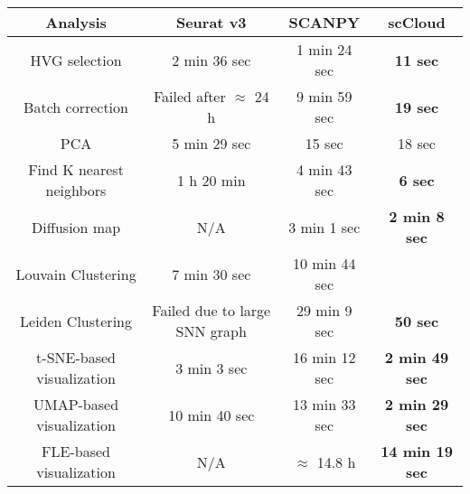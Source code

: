 \documentclass[10pt]{article}
\begin{document}
\begin{table}[H]
	\centering
	\begin{tabular}{|c|c|c|c|}
		\hline
		Analysis & Seurat v3 & SCANPY & scCloud\\
		\hline \hline
		HVG selection & 2 min 36 sec & 1 min 24 sec & \textbf{11 sec} \\
		\hline
		Batch correction & Failed after $\approx$ 24 h & 9 min 59 sec & \textbf{19 sec} \\
		\hline
		PCA & 5 min 29 sec & 15 sec & 18 sec \\
		\hline
		Find K nearest neighbors &  1 h 20 min &  4 min 43 sec & \textbf{6 sec}\\
		\hline
		Diffusion map & N/A & 3 min 1 sec & \textbf{2 min 8 sec} \\
		\hline
		Louvain Clustering & 7 min 30 sec & 10 min 44 sec & \\
		\hline 
		Leiden Clustering & Failed due to large SNN graph & 29 min 9 sec & \textbf{50 sec}\\
		\hline
		t-SNE-based visualization & 3 min 3 sec & 16 min 12 sec & \textbf{2 min 49 sec}\\
		\hline
		UMAP-based visualization & 10 min 40 sec & 13 min 33 sec  & \textbf{2 min 29 sec}\\
		\hline
		FLE-based visualization & N/A & $\approx$ 14.8  h & \textbf{14 min 19 sec}\\
		\hline
	\end{tabular}
\end{table}
\end{document}
